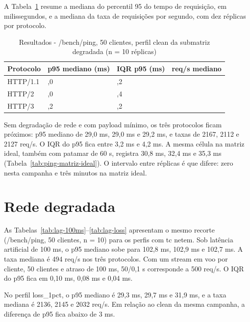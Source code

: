 A Tabela~\ref{tab:submatriz-clean} resume a mediana do percentil 95 do tempo de requisição, em milissegundos, e a mediana da taxa de requisições por segundo, com dez réplicas por protocolo.

\begin{table}[H]
\centering
\caption{Resultados - /bench/ping, 50 clientes, perfil clean da submatriz degradada (n = 10 réplicas)}\label{tab:submatriz-clean}
\small
\setlength{\tabcolsep}{3pt}
\begin{tabular}{@{}>{\raggedright\arraybackslash}p{42mm}>{\raggedright\arraybackslash}p{36mm}>{\raggedright\arraybackslash}p{32mm}>{\raggedright\arraybackslash}p{32mm}@{}} \hline
\textbf{Protocolo} & \textbf{p95 mediano (ms)} & \textbf{IQR p95 (ms)} & \textbf{req/s mediano} \\
\hline
HTTP/1.1 & 29,0 & 4,2 & 2167 \\
HTTP/2 & 29,0 & 3,4 & 2112 \\
HTTP/3 & 29,2 & 3,2 & 2127 \\
\hline
\end{tabular}
\end{table}

Sem degradação de rede e com payload mínimo, os três protocolos ficam próximos: p95 mediano de 29,0 ms, 29,0 ms e 29,2 ms, e taxas de 2167, 2112 e 2127 req/s. O IQR do p95 fica entre 3,2 ms e 4,2 ms. A mesma célula na matriz ideal, também com patamar de 60 s, registra 30,8 ms, 32,4 ms e 35,3 ms (Tabela~\ref{tab:ping-matriz-ideal}). O intervalo entre réplicas é que difere: zero nesta campanha e três minutos na matriz ideal.

\section{Rede degradada}\label{sec:rede-degradada-resultados}

As Tabelas~\ref{tab:lag-100ms}--\ref{tab:lag-loss} apresentam o mesmo recorte (/bench/ping, 50 clientes, n = 10) para os perfis com tc netem. Sob latência artificial de 100 ms, o p95 mediano sobe para 102,8 ms, 102,9 ms e 102,7 ms. A taxa mediana é 494 req/s nos três protocolos. Com um stream em voo por cliente, 50 clientes e atraso de 100 ms, 50/0,1 s corresponde a 500 req/s. O IQR do p95 fica em 0,10 ms, 0,08 ms e 0,04 ms.

No perfil loss\_1pct, o p95 mediano é 29,3 ms, 29,7 ms e 31,9 ms, e a taxa mediana é 2136, 2145 e 2032 req/s. Em relação ao clean da mesma campanha, a diferença de p95 fica abaixo de 3 ms.

